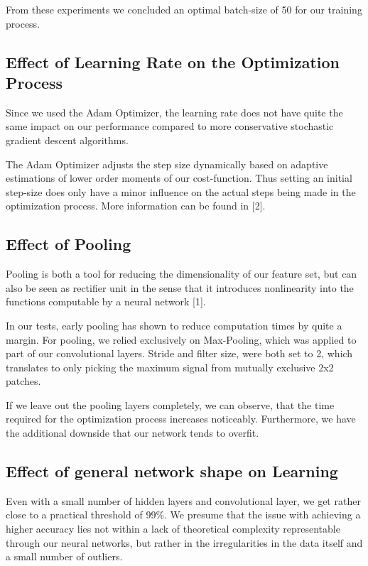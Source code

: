 \documentclass{article}
\begin{document}
From these experiments we concluded an optimal batch-size of 50 for our training process.


\subsection{Effect of Learning Rate on the Optimization Process}

Since we used the Adam Optimizer, the learning rate does not have quite the same impact on our performance compared to more conservative stochastic gradient descent algorithms.

The Adam Optimizer adjusts the step size dynamically based on adaptive estimations of lower order moments of our cost-function. Thus setting an initial step-size does only have a minor influence on the actual steps being made in the optimization process. More information can be  found in [2].

\subsection{Effect of Pooling}
Pooling is both a tool for reducing the dimensionality of our feature set, but can also be seen as rectifier unit in the sense that it introduces nonlinearity into the functions computable by a neural network [1].

In our tests, early pooling has shown to reduce computation times by quite a margin. For pooling, we relied exclusively on Max-Pooling, which was applied to part of our convolutional layers. Stride and filter size, were both set to 2, which translates to only picking the maximum signal from mutually exclusive 2x2 patches.

If we leave out the pooling layers completely, we can observe, that the time required for the optimization process  increases noticeably. Furthermore, we have the additional downside that our network tends to overfit.

\subsection{Effect of general network shape on Learning}
Even with a small number of hidden layers and convolutional layer, we get rather close to a practical threshold of 99\%. We presume that the issue with achieving a higher accuracy lies not within a lack of theoretical complexity representable through our neural networks, but rather in the irregularities in the data itself and a small number of outliers.
\end{document}

